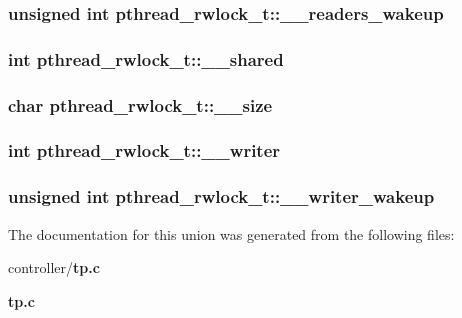 \subsubsection[{\_\-\_\-readers\_\-wakeup}]{\setlength{\rightskip}{0pt plus 5cm}unsigned int {\bf pthread\_\-rwlock\_\-t::\_\-\_\-readers\_\-wakeup}}\label{unionpthread__rwlock__t_a6aecf13b58aaa0e2e4aabf7b7f4ee943}
\subsubsection[{\_\-\_\-shared}]{\setlength{\rightskip}{0pt plus 5cm}int {\bf pthread\_\-rwlock\_\-t::\_\-\_\-shared}}\label{unionpthread__rwlock__t_a3fcd8a3f2aff547625445f21026386db}
\subsubsection[{\_\-\_\-size}]{\setlength{\rightskip}{0pt plus 5cm}char {\bf pthread\_\-rwlock\_\-t::\_\-\_\-size}}\label{unionpthread__rwlock__t_ab881e72a6e4fdb34a0f0d1a625573d11}
\subsubsection[{\_\-\_\-writer}]{\setlength{\rightskip}{0pt plus 5cm}int {\bf pthread\_\-rwlock\_\-t::\_\-\_\-writer}}\label{unionpthread__rwlock__t_ae0c130cd48165f630985b027ccfc6ec3}
\subsubsection[{\_\-\_\-writer\_\-wakeup}]{\setlength{\rightskip}{0pt plus 5cm}unsigned int {\bf pthread\_\-rwlock\_\-t::\_\-\_\-writer\_\-wakeup}}\label{unionpthread__rwlock__t_a7cc34f5fc0088a9360619b41e63f808c}


The documentation for this union was generated from the following files:\begin{DoxyCompactItemize}
\item 
controller/{\bf tp.c}\item 
{\bf tp.c}\end{DoxyCompactItemize}
